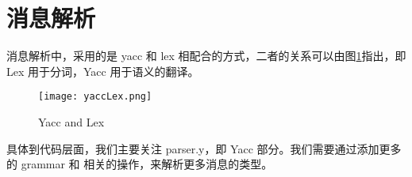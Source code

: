 \section{消息解析}

消息解析中，采用的是 yacc 和 lex 相配合的方式，二者的关系可以由图\ref{fig:yaccLex}指出，即 Lex 用于分词，Yacc 用于语义的翻译。

\begin{figure}[htbp!]
    \centering
    \texttt{[image: yaccLex.png]}
    \caption{Yacc and Lex}\label{fig:yaccLex}
    \vspace{-1em}
\end{figure}

具体到代码层面，我们主要关注 parser.y，即 Yacc 部分。我们需要通过添加更多的 grammar 和 相关的操作，来解析更多消息的类型。


